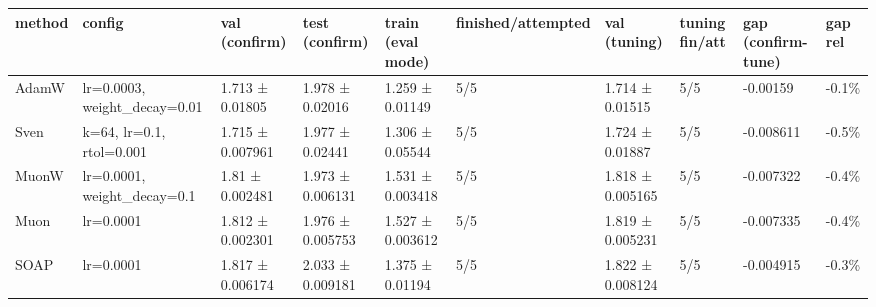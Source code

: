 \begin{tabular}{llllllllll}
\toprule
method & config & val (confirm) & test (confirm) & train (eval mode) & finished/attempted & val (tuning) & tuning fin/att & gap (confirm-tune) & gap rel \\
\midrule
AdamW & lr=0.0003, weight\_decay=0.01 & 1.713 ± 0.01805 & 1.978 ± 0.02016 & 1.259 ± 0.01149 & 5/5 & 1.714 ± 0.01515 & 5/5 & -0.00159 & -0.1\% \\
Sven & k=64, lr=0.1, rtol=0.001 & 1.715 ± 0.007961 & 1.977 ± 0.02441 & 1.306 ± 0.05544 & 5/5 & 1.724 ± 0.01887 & 5/5 & -0.008611 & -0.5\% \\
MuonW & lr=0.0001, weight\_decay=0.1 & 1.81 ± 0.002481 & 1.973 ± 0.006131 & 1.531 ± 0.003418 & 5/5 & 1.818 ± 0.005165 & 5/5 & -0.007322 & -0.4\% \\
Muon & lr=0.0001 & 1.812 ± 0.002301 & 1.976 ± 0.005753 & 1.527 ± 0.003612 & 5/5 & 1.819 ± 0.005231 & 5/5 & -0.007335 & -0.4\% \\
SOAP & lr=0.0001 & 1.817 ± 0.006174 & 2.033 ± 0.009181 & 1.375 ± 0.01194 & 5/5 & 1.822 ± 0.008124 & 5/5 & -0.004915 & -0.3\% \\
\bottomrule
\end{tabular}
